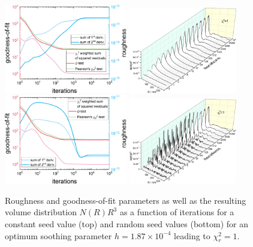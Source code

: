 \begin{figure}[htb]
\centering
\includegraphics[width=0.48\textwidth]{../images/form_factor/EM/EMconstant_seed_smooth_0_000187_goodness_of_fit.png}
\hspace{0.06\textwidth}
\includegraphics[width=0.42\textwidth]{../images/form_factor/EM/EMconstant_seed_smooth_0_000187_NR.png}
\includegraphics[width=0.48\textwidth]{../images/form_factor/EM/EMrandom_seed_smooth_0_000187_goodness_of_fit.png}
\hspace{0.06\textwidth}
\includegraphics[width=0.42\textwidth]{../images/form_factor/EM/EMrandom_seed_smooth_0_000187_NR.png}
\caption{Roughness and goodness-of-fit parameters as well as the resulting volume distribution $N(R)R^3$ as a function of iterations for  a constant seed value (top) and random seed values (bottom) for an optimum soothing parameter $h=1.87\times 10^{-4}$ leading to $\chi_r^2=1$.\label{fig:EMhoptimum}}
\end{figure}

